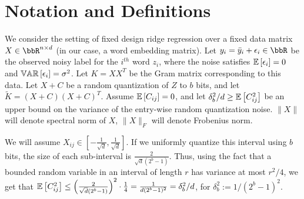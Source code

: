 \documentclass[12pt]{article}
\newcommand{\eps}{\epsilon}
\newcommand{\by}{\bar{y}}
\newcommand{\tK}{\tilde{K}}
\newcommand{\defeq}{:=}
\begin{document}

%


\section{Notation and Definitions}
We consider the setting of fixed design ridge regression over a fixed data matrix $X \in \RR^{n\times d}$ (in our case, a word embedding matrix). Let $y_i = \by_i + \eps_i \in \RR$ be the observed noisy label for the $i^{th}$ word $z_i$, where the noise satisfies $\expect{}{\eps_i} = 0$ and $\var{}{\eps_i} = \sigma^2$.  Let $K = XX^T$ be the Gram matrix corresponding to this data.  Let $X+C$ be a random quantization of $Z$ to $b$ bits, and let $\tK = (X+C)(X+C)^T$. Assume $\expect{}{C_{ij}} = 0$, and let $\delta_b^2/d \geq \expect{}{C_{ij}^2}$ be an upper bound on the variance of the entry-wise random quantization noise.  $\|X\|$ will denote spectral norm of $X$, $\|X\|_F$ will denote Frobenius norm.

We will assume $X_{ij} \in [-\frac{1}{\sqrt{d}},\frac{1}{\sqrt{d}}]$.  If we uniformly quantize this interval using $b$ bits, the size of each sub-interval is $\frac{2}{\sqrt{d}(2^b-1)}$.  Thus, using the fact that a bounded random variable in an interval of length $r$ has variance at most $r^2/4$, we get that $\expect{}{C_{ij}^2} \leq \Big(\frac{2}{\sqrt{d}(2^b-1)}\Big)^2\cdot \frac{1}{4} = \frac{1}{d(2^b-1)^2} = \delta_b^2/d$, for $\delta_b^2 \defeq 1/(2^b-1)^2$.

 
%

\end{document}
